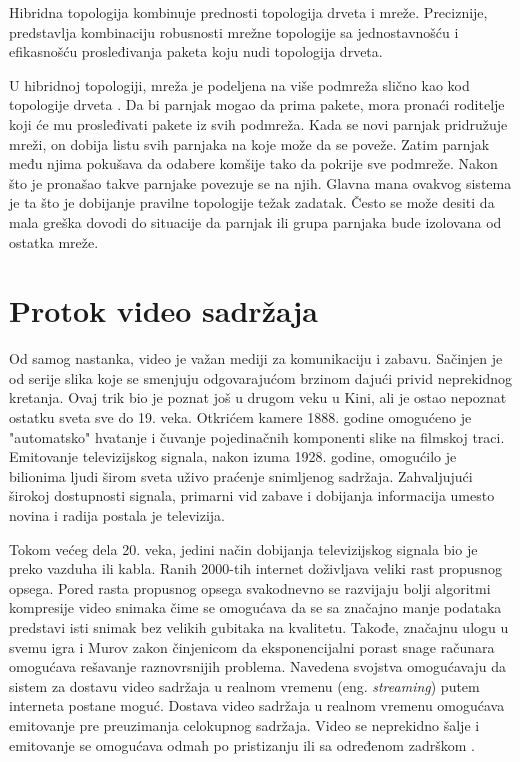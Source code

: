 \documentclass[12pt,oneside]{memoir}
\begin{document}
Hibridna topologija kombinuje prednosti topologija drveta i mreže. Preciznije, predstavlja kombinaciju robusnosti mrežne topologije sa jednostavnošću i efikasnošću prosleđivanja paketa koju nudi topologija drveta.

U hibridnoj topologiji, mreža je podeljena na više podmreža slično kao kod topologije drveta \cite{Shen:2009}. Da bi parnjak mogao da prima pakete, mora pronaći roditelje koji će mu prosleđivati pakete iz svih podmreža. Kada se novi parnjak pridružuje mreži, on dobija listu svih parnjaka na koje može da se poveže. Zatim parnjak među njima pokušava da odabere komšije tako da pokrije sve podmreže. Nakon što je pronašao takve parnjake povezuje se na njih. Glavna mana ovakvog sistema je ta što je dobijanje pravilne topologije težak zadatak. Često se može desiti da mala greška dovodi do situacije da parnjak ili grupa parnjaka bude izolovana od ostatka mreže.

\section{Protok video sadržaja}
\label{P2P.4}

Od samog nastanka, video je važan mediji za komunikaciju i zabavu. Sačinjen je od serije slika koje se smenjuju odgovarajućom brzinom dajući privid neprekidnog kretanja. Ovaj trik bio je poznat još u drugom veku u Kini, ali je ostao nepoznat ostatku sveta sve do 19. veka. Otkrićem kamere 1888. godine omogućeno je "automatsko" hvatanje i čuvanje pojedinačnih komponenti slike na filmskoj traci. Emitovanje televizijskog signala, nakon izuma 1928. godine, omogućilo je bilionima ljudi širom sveta uživo praćenje snimljenog sadržaja. Zahvaljujući širokoj dostupnosti signala, primarni vid zabave i dobijanja informacija umesto novina i radija postala je televizija.

Tokom većeg dela 20. veka, jedini način dobijanja televizijskog signala bio je preko vazduha ili kabla. Ranih 2000-tih internet doživljava veliki rast propusnog opsega. Pored rasta propusnog opsega svakodnevno se razvijaju bolji algoritmi kompresije video snimaka čime se omogućava da se sa značajno manje podataka predstavi isti snimak bez velikih gubitaka na kvalitetu.
Takođe, značajnu ulogu u svemu igra i Murov zakon \cite{Moore} činjenicom da eksponencijalni porast snage računara omogućava rešavanje raznovrsnijih problema. Navedena svojstva omogućavaju da sistem za dostavu video sadržaja u realnom vremenu (eng. \textit{streaming}) putem interneta postane moguć. Dostava video sadržaja u realnom vremenu omogućava emitovanje pre preuzimanja celokupnog sadržaja. Video se neprekidno šalje i emitovanje se omogućava odmah po pristizanju ili sa određenom zadrškom \cite{Telecom}.
\end{document}
